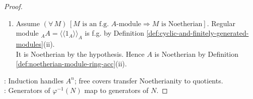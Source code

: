 \begin{theorem}
\begin{proof}
\begin{enumerate}[label=\roman*.]
\begin{enumerate}[label=(\alph*)]
The forward implication holds by arbitrariness of $M$.
\end{enumerate}
\item[$(\Leftarrow)$] Assume $(\forall\,M)\,[M\text{ is an f.g. }A\text{-module}\Rightarrow M\text{ is Noetherian}]$. Regular module ${}_A A=\langle\!\langle1_A\rangle\!\rangle_A$ is f.g. by Definition \ref{def:cyclic-and-finitely-generated-modules}(ii).\\
It is Noetherian by the hypothesis. Hence $A$ is Noetherian by Definition \ref{def:noetherian-module-ring-acc}(ii).
\end{enumerate}
: Induction handles $A^n$; free covers transfer Noetherianity to quotients.\\
: Generators of $\varphi^{-1}(N)$ map to generators of $N$.
\end{proof}
\end{theorem}

